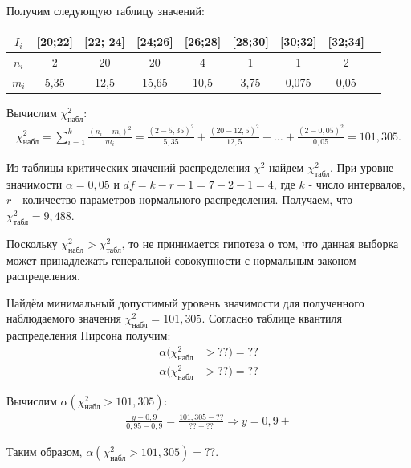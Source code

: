\documentclass[utf8, a4paper, 14pt, russian, oneside]{book}
\begin{document}
Получим следующую таблицу значений:
\begin{table}[h!]
    \centering
    \begin{tabular}{|c|c|c|c|c|c|c|c|c|}
        \hline
        $I_i$  & [20;22] & [22; 24] & [24;26] & [26;28] & [28;30] & [30;32] & [32;34] \\
        \hline
        $n_i$ & 2 & 20 & 20 & 4 & 1 & 1 & 2 \\
        \hline
        $m_i$ & 5,35 & 12,5 & 15,65 & 10,5 & 3,75 & 0,075 & 0,05\\
        \hline
    \end{tabular}
\end{table}
\newpage

Вычислим $\chi^2_{\text{набл}}$:
\begin{align*}
    \chi^2_{\text{набл}} = \sum\limits_{i=1}^k \frac{(n_i - m_i)^2}{m_i} = \frac{(2 - 5,35)^2}{5,35} + \frac{(20 - 12,5)^2}{12,5} + \dots + \frac{(2 - 0,05)^2}{0,05} = 101,305.
\end{align*}

Из таблицы критических значений распределения $\chi^2$ найдем $\chi^2_{\text{табл}}$.
При уровне значимости $\alpha = 0,05$ и $df = k - r -1 = 7 - 2 - 1 = 4$,
где $k$ - число интервалов, $r$ - количество параметров нормального распределения. Получаем, что $\chi^2_{\text{табл}} = 9,488$.

Поскольку $\chi^2_{\text{набл}} > \chi^2_{\text{табл}}$, то не принимается гипотеза о том, что данная выборка может принадлежать генеральной совокупности
с нормальным законом распределения.

Найдём минимальный допустимый уровень значимости для полученного наблюдаемого значения $\chi^2_{\text{набл}} = 101,305$. Согласно таблице квантиля распределения Пирсона получим:
\begin{align*}
    \alpha(\chi^2_{\text{набл}} &> ??) = ?? \\
    \alpha(\chi^2_{\text{набл}} &> ??) = ??
\end{align*}

Вычислим $\alpha(\chi^2_{\text{набл}} > 101,305)$:
\begin{align*}
    \frac{y - 0,9}{0,95 - 0,9} = \frac{101,305 - ??}{?? - ??} \Rightarrow y = 0,9 + 
\end{align*}

Таким образом, $\alpha(\chi^2_{\text{набл}} > 101,305) = ??$.

\end{document}
